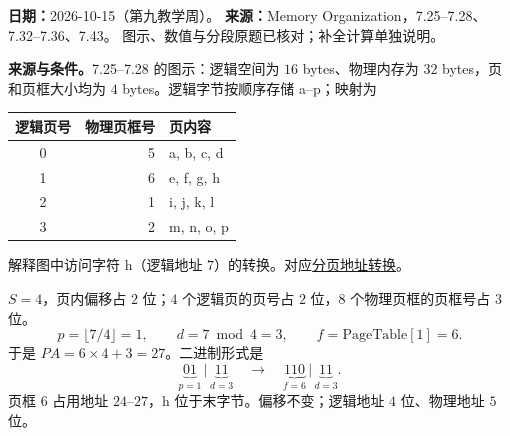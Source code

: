 \begingroup
\renewcommand{\recordid}[1]{}
\renewcommand{\relatedtopic}[2]{\hyperref[topic:#1]{#2}}

\textbf{日期：}2026-10-15（第九教学周）。
\textbf{来源：}Memory Organization，7.25--7.28、7.32--7.36、7.43。
图示、数值与分段原题已核对；补全计算单独说明。

\nopagebreak[4]
\textbf{来源与条件。}7.25--7.28 的图示：逻辑空间为 $16$ bytes、物理内存为 $32$ bytes，页和页框大小均为 $4$ bytes。逻辑字节按顺序存储 a--p；映射为
\begin{center}
\begin{tabular}{@{}crl@{}}
\toprule
逻辑页号 & 物理页框号 & 页内容 \\
\midrule
0 & 5 & a, b, c, d \\
1 & 6 & e, f, g, h \\
2 & 1 & i, j, k, l \\
3 & 2 & m, n, o, p \\
\bottomrule
\end{tabular}
\end{center}
解释图中访问字符 h（逻辑地址 $7$）的转换。对应\relatedtopic{SC2005-L16-T01}{分页地址转换}。

\begin{checkedsolution}
$S=4$，页内偏移占 $2$ 位；$4$ 个逻辑页的页号占 $2$ 位，$8$ 个物理页框的页框号占 $3$ 位。
\[
 p=\lfloor7/4\rfloor=1,\qquad d=7\bmod4=3,\qquad
 f=\mathrm{PageTable}[1]=6.
\]
于是 $PA=6\times4+3=27$。二进制形式是
\[
  \underbrace{01}_{p=1}\,\big|\,\underbrace{11}_{d=3}
  \quad\longrightarrow\quad
  \underbrace{110}_{f=6}\,\big|\,\underbrace{11}_{d=3}.
\]
页框 $6$ 占用地址 $24$--$27$，h 位于末字节。偏移不变；逻辑地址 $4$ 位、物理地址 $5$ 位。
\end{checkedsolution}

